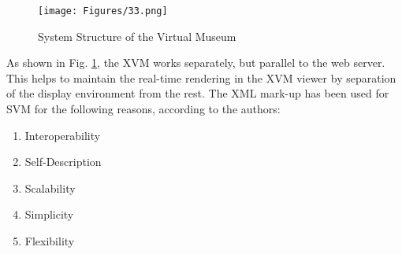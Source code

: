 \begin{figure}[htbp]
\begin{center}
\texttt{[image: Figures/33.png]}
\caption{System Structure of the Virtual Museum}
\label{fig2_virtual_museum}
\end{center}
\end{figure}

As shown in Fig. \ref{fig2_virtual_museum}, the XVM works separately, but parallel to the web server. This helps to maintain the real-time rendering in the XVM viewer by separation of the display environment from the rest.
The XML mark-up has been used for SVM for the following reasons, according to the authors:
\begin{enumerate}
\item{Interoperability}
\item{Self-Description}
\item{Scalability}
\item{Simplicity}
\item{Flexibility}
\end{enumerate}



